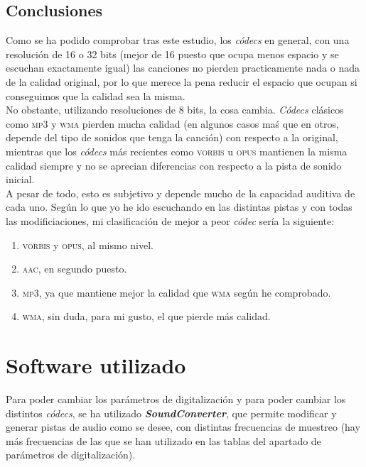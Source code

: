 \documentclass[11pt,a4paper]{article}
\begin{document}
\subsection{Conclusiones}

Como se ha podido comprobar tras este estudio, los \textit{códecs} en general, con una resolución de 16 o 32 bits (mejor de 16 puesto que ocupa menos espacio y se escuchan exactamente igual) las canciones no pierden practicamente nada o nada de la calidad original, por lo que merece la pena reducir el espacio que ocupan si conseguimos que la calidad sea la misma.\\

No obstante, utilizando resoluciones de 8 bits, la cosa cambia. \textit{Códecs} clásicos como \textsc{mp3} y \textsc{wma} pierden mucha calidad (en algunos casos maś que en otros, depende del tipo de sonidos que tenga la canción) con respecto a la original, mientras que los \textit{códecs} más recientes como \textsc{vorbis} u \textsc{opus} mantienen la misma calidad siempre y no se aprecian diferencias con respecto a la pista de sonido inicial.\\

A pesar de todo, esto es subjetivo y depende mucho de la capacidad auditiva de cada uno. Según lo que yo he ido escuchando en las distintas pistas y con todas las modificiaciones, mi clasificación de mejor a peor \textit{códec} sería la siguiente:

\begin{enumerate}
	\item \textsc{vorbis} y \textsc{opus}, al mismo nivel.
	\item \textsc{aac}, en segundo puesto.
	\item \textsc{mp3}, ya que mantiene mejor la calidad que \textsc{wma} según he comprobado.
	\item \textsc{wma}, sin duda, para mi gusto, el que pierde más calidad.
\end{enumerate}

\newpage

\section{Software utilizado}

Para poder cambiar los parámetros de digitalización y para poder cambiar los distintos \textit{códecs}, se ha utilizado \textbf{\textit{SoundConverter}}, que permite modificar y generar pistas de audio como se desee, con distintas frecuencias de muestreo (hay más frecuencias de las que se han utilizado en las tablas del apartado de parámetros de digitalización).\\
\end{document}
